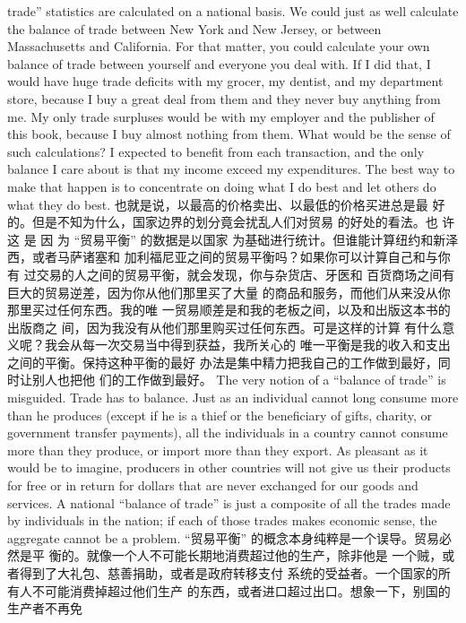 \begin{paracol}{2}
trade'' statistics are calculated on a national basis. We could just
as well calculate the balance of trade between New York and
New Jersey, or between Massachusetts and California. For that
matter, you could calculate your own balance of trade between
yourself and everyone you deal with. If I did that, I would have
huge trade deficits with my grocer, my dentist, and my department store, because I buy a great deal from them and they
never buy anything from me. My only trade surpluses would be
with my employer and the publisher of this book, because I buy
almost nothing from them. What would be the sense of such
calculations? I expected to benefit from each transaction, and
the only balance I care about is that my income exceed my expenditures. The best way to make that happen is to concentrate
on doing what I do best and let others do what they do best.
\switchcolumn
也就是说，以最高的价格卖出、以最低的价格买进总是最
好的。但是不知为什么，国家边界的划分竟会扰乱人们对贸易
的好处的看法。也 许 这 是 因 为 “贸易平衡” 的数据是以国家
为基础进行统计。但谁能计算纽约和新泽西，或者马萨诸塞和
加利福尼亚之间的贸易平衡吗？如果你可以计算自己和与你有
过交易的人之间的贸易平衡，就会发现，你与杂货店、牙医和
百货商场之间有巨大的贸易逆差，因为你从他们那里买了大量
的商品和服务，而他们从来没从你那里买过任何东西。我的唯
一贸易顺差是和我的老板之间，以及和出版这本书的出版商之
间，因为我没有从他们那里购买过任何东西。可是这样的计算
有什么意义呢？我会从每一次交易当中得到获益，我所关心的
唯一平衡是我的收入和支出之间的平衡。保持这种平衡的最好
办法是集中精力把我自己的工作做到最好，同时让别人也把他
们的工作做到最好。
\switchcolumn*
The very notion of a ``balance of trade'' is misguided. Trade
has to balance. Just as an individual cannot long consume more
than he produces (except if he is a thief or the beneficiary of
gifts, charity, or government transfer payments), all the individuals in a country cannot consume more than they produce, or
import more than they export. As pleasant as it would be to
imagine, producers in other countries will not give us their
products for free or in return for dollars that are never exchanged for our goods and services. A national ``balance of
trade'' is just a composite of all the trades made by individuals
in the nation; if each of those trades makes economic sense, the
aggregate cannot be a problem.
\switchcolumn
“贸易平衡” 的概念本身纯粹是一个误导。贸易必然是平
衡的。就像一个人不可能长期地消费超过他的生产，除非他是
一个贼，或者得到了大礼包、慈善捐助，或者是政府转移支付
系统的受益者。一个国家的所有人不可能消费掉超过他们生产
的东西，或者进口超过出口。想象一下，别国的生产者不再免

\end{paracol}
